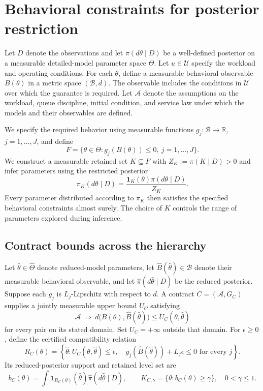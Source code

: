 \section{Behavioral constraints for posterior restriction}

Let $D$ denote the observations and let $\pi(d\theta\mid D)$ be a
well-defined posterior on a measurable detailed-model parameter space
$\Theta$. Let $u\in\mathcal U$ specify the workload and operating conditions.
For each $\theta$, define a measurable behavioral observable $B(\theta)$ in
a metric space $(\mathcal B,d)$. The observable includes the conditions in
$\mathcal U$ over which the guarantee is required. Let $\mathcal A$ denote
the assumptions on the workload, queue discipline, initial condition, and
service law under which the models and their observables are defined.

We specify the required behavior using measurable functions
$g_j:\mathcal B\to\mathbb R$, $j=1,\ldots,J$, and define
\[
 F=\{\theta\in\Theta:g_j(B(\theta))\leq0,\ j=1,\ldots,J\}.
\]
We construct a measurable retained set $K\subseteq F$ with
$Z_K:=\pi(K\mid D)>0$ and infer parameters using the restricted posterior
\[
 \pi_K(d\theta\mid D)
 =\frac{\mathbf 1_K(\theta)\pi(d\theta\mid D)}{Z_K}.
\]
Every parameter distributed according to $\pi_K$ then satisfies the
specified behavioral constraints almost surely. The choice of $K$ controls
the range of parameters explored during inference.

\subsection{Contract bounds across the hierarchy}

Let $\hat\theta\in\widehat\Theta$ denote reduced-model parameters, let
$\widehat B(\hat\theta)\in\mathcal B$ denote their measurable behavioral observable,
and let $\hat\pi(d\hat\theta\mid D)$ be the reduced posterior. Suppose
each $g_j$ is $L_j$-Lipschitz with respect to $d$. A contract
$C=(\mathcal A,G_C)$ supplies a jointly measurable upper bound $U_C$ satisfying
\[
 \mathcal A\ \Longrightarrow\
 d\bigl(B(\theta),\widehat B(\hat\theta)\bigr)
 \leq U_C(\theta,\hat\theta)
\]
for every pair on its stated domain. Set $U_C=+\infty$ outside that domain.
For $\epsilon\geq0$, define the certified compatibility relation
\[
 R_C(\theta)=\left\{\hat\theta:
 U_C(\theta,\hat\theta)\leq\epsilon,\quad
 g_j(\widehat B(\hat\theta))+L_j\epsilon\leq0
 \text{ for every }j\right\}.
\]
Its reduced-posterior support and retained level set are
\[
 b_C(\theta)=\int\mathbf1_{R_C(\theta)}(\hat\theta)
                  \hat\pi(d\hat\theta\mid D),\qquad
 K_{C,\gamma}=\{\theta:b_C(\theta)\geq\gamma\},
 \quad 0<\gamma\leq1.
\]

